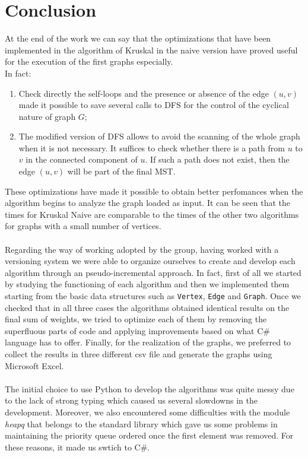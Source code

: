 \section{Conclusion}
At the end of the work we can say that the optimizations that have been implemented in the algorithm of Kruskal in the naive version have proved useful for the execution of the first graphs especially. \\
\noindent
In fact:
\begin{enumerate}
    \item Check directly the self-loops and the presence or absence of the edge $(u, v)$ made it possible to save several calls to DFS for the control of the cyclical nature of graph $G$;
    \item The modified version of DFS allows to avoid the scanning of the whole graph when it is not necessary. It suffices to check whether there is a path from $u$ to $v$ in the connected component of $u$. If such a path does not exist, then the edge $(u, v)$ will be part of the final MST.
\end{enumerate}
\noindent
These optimizations have made it possible to obtain better perfomances when the algorithm begins to analyze the graph loaded as input. It can be seen that the times for Kruskal Naive are comparable to the times of the other two algorithms for graphs with a small number of vertices. \\
\\
\noindent
Regarding the way of working adopted by the group, having worked with a versioning system we were able to organize ourselves to create and develop each algorithm through an pseudo-incremental approach. In fact, first of all we started by studying the functioning of each algorithm and then we implemented them starting from the basic data structures such as \verb|Vertex|, \verb|Edge| and \verb|Graph|. Once we checked that in all three cases the algorithms obtained identical results on the final sum of weights, we tried to optimize each of them by removing the superfluous parts of code and applying improvements based on what C\# language has to offer. Finally, for the realization of the graphs, we preferred to collect the results in three different csv file and generate the graphs using Microsoft Excel. \\
\\
\noindent
The initial choice to use Python to develop the algorithms was quite messy due to the lack of strong typing which caused us several slowdowns in the development. Moreover, we also encountered some difficulties with the module \textit{heapq} that belongs to the standard library which gave us some problems in maintaining the priority queue ordered once the first element was removed. For these reasons, it made us swtich to C\#. \\
